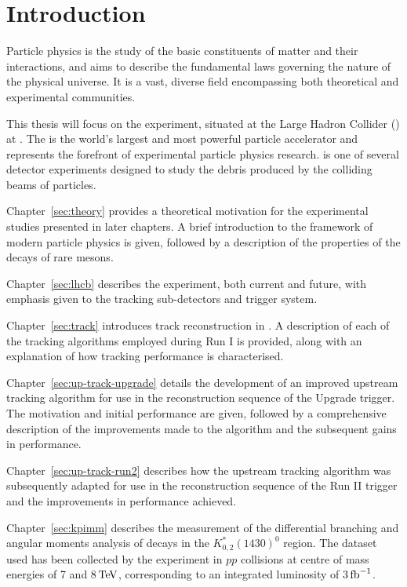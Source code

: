 \section{Introduction}
\label{sec:intro}

Particle physics is the study of the basic constituents of matter and their interactions, and aims to describe the fundamental laws governing the nature of the physical universe. It is a vast, diverse field encompassing both theoretical and experimental communities.

This thesis will focus on the \lhcb experiment, situated at the Large Hadron Collider (\lhc) at \cern. The \lhc is the world's largest and most powerful particle accelerator and represents the forefront of experimental particle physics research. \lhcb is one of several detector experiments designed to study the debris produced by the colliding beams of particles.

Chapter~\ref{sec:theory} provides a theoretical motivation for the experimental studies presented in later chapters. A brief introduction to the framework of modern particle physics is given, followed by a description of the properties of the decays of rare \B mesons.

Chapter~\ref{sec:lhcb} describes the \lhcb experiment, both current and future, with emphasis given to the tracking sub-detectors and trigger system.

Chapter~\ref{sec:track} introduces track reconstruction in \lhcb. A description of each of the tracking algorithms employed during \lhcb Run I is provided, along with an explanation of how tracking performance is characterised.

Chapter~\ref{sec:up-track-upgrade} details the development of an improved upstream tracking algorithm for use in the reconstruction sequence of the \lhcb Upgrade trigger. The motivation and initial performance are given, followed by a comprehensive description of the improvements made to the algorithm and the subsequent gains in performance. 

Chapter~\ref{sec:up-track-run2} describes how the upstream tracking algorithm was subsequently adapted for use in the reconstruction sequence of the \lhcb Run II trigger and the improvements in performance achieved.

Chapter~\ref{sec:kpimm} describes the measurement of the differential branching and angular moments analysis of \BdToKpimm decays in the $K^{*}_{0,2}(1430)^{0}$ region. The dataset used has been collected by the \lhcb experiment in $pp$ collisions at centre of mass energies of 7 and 8${\mathrm{\,Te\kern -0.1em V}}$, corresponding to an integrated luminosity of 3$\mbox{\,fb}^{-1}$.
